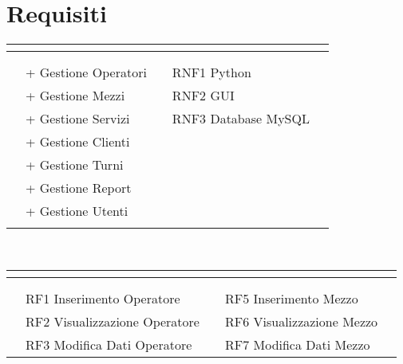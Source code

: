 \documentclass[green, fancy, 11pt]{elegantbook}
\begin{document}
\section{Requisiti}
\begin{center}
\noindent
\begin{tabular}{|p{0.2cm} p{2.5cm} p{1.85cm} p{0.2cm} p{2.5cm} p{1.85cm} p{0.2cm}|}
	\hline
	\multicolumn{7}{|c|}{\cellcolor{DarkGreen}{\textcolor{white}{REQUISITI}}}\\
	\hline
	&&&&&&\\
	\cline{2-3} \cline{5-6}
	&\multicolumn{2}{|l|}{\cellcolor{RussianGreen}{\textcolor{white}{FUNZIONALI}}}&&\multicolumn{2}{|l|}{\cellcolor{RussianGreen}{\textcolor{white}{NON FUNZIONALI}}}&\\
	\cline{2-3} \cline{5-6}
	&\multicolumn{2}{|l|}{+ Gestione Operatori}&&\multicolumn{2}{|l|}{RNF1 Python}&\\ 
	&\multicolumn{2}{|l|}{+ Gestione Mezzi}&&\multicolumn{2}{|l|}{RNF2 GUI}&\\ 
	&\multicolumn{2}{|l|}{+ Gestione Servizi}&&\multicolumn{2}{|l|}{RNF3 Database MySQL}&\\ 
	\cline{5-6}
	&\multicolumn{2}{|l|}{+ Gestione Clienti}&&&&\\
	&\multicolumn{2}{|l|}{+ Gestione Turni}&&&&\\
	&\multicolumn{2}{|l|}{+ Gestione Report}&&&&\\
	&\multicolumn{2}{|l|}{+ Gestione Utenti}&&&&\\
	\cline{2-3}
	&&&&&&\\
	\hline
\end{tabular}
\\
\begin{tabular}{|p{0.2cm} p{2.5cm} p{2cm} p{0.2cm} p{2.5cm} p{1cm} p{0.2cm}|}
	\hline
	\multicolumn{7}{|c|}{\cellcolor{DarkGreen}{\textcolor{white}{REQUISITI FUNZIONALI}}}\\
	\hline
	&&&&&&\\
	\cline{2-3} \cline{5-6}
	&\multicolumn{2}{|l|}{\cellcolor{RussianGreen}{\textcolor{white}{GESTIONE OPERATORI}}}&&\multicolumn{2}{|l|}{\cellcolor{RussianGreen}{\textcolor{white}{GESTIONE MEZZI}}}&\\
	\cline{2-3} \cline{5-6}
	&\multicolumn{2}{|l|}{RF1 Inserimento Operatore}&&\multicolumn{2}{|l|}{RF5 Inserimento Mezzo}&\\
	&\multicolumn{2}{|l|}{RF2 Visualizzazione Operatore}&&\multicolumn{2}{|l|}{RF6 Visualizzazione Mezzo}&\\
	&\multicolumn{2}{|l|}{RF3 Modifica Dati Operatore}&&\multicolumn{2}{|l|}{RF7  Modifica Dati Mezzo}&\\

\end{tabular}
\end{center}
\end{document}
